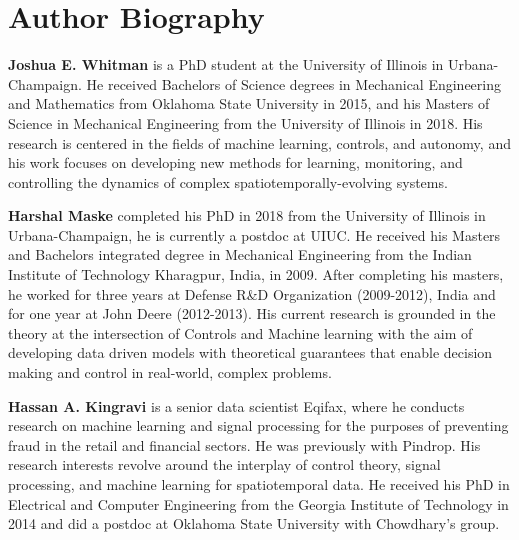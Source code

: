 \documentclass[letterpaper,12pt,peerreviewca,draftcls]{IEEEtran}
\begin{document}
\renewcommand{\thealgorithm}{S\arabic{algorithm}} 
\setcounter{algorithm}{0}

\clearpage


\clearpage


\clearpage





\newpage
\section{Author Biography}

\noindent \textbf{Joshua E. Whitman} is a PhD student at the University of Illinois in Urbana-Champaign. He received Bachelors of Science degrees in Mechanical Engineering and Mathematics from Oklahoma State University in 2015, and his Masters of Science in Mechanical Engineering from the University of Illinois in 2018. His research is centered in the fields of machine learning, controls, and autonomy, and his work focuses on developing new methods for learning, monitoring, and controlling the dynamics of complex spatiotemporally-evolving systems.

\noindent \textbf{Harshal Maske} completed his PhD in 2018 from the University of Illinois in Urbana-Champaign, he is currently a postdoc at UIUC. He received his Masters and Bachelors integrated degree in Mechanical Engineering from the Indian Institute of Technology Kharagpur, India, in 2009. After completing his masters, he worked for three years at Defense R\&D Organization (2009-2012), India and for one year at John Deere (2012-2013). His current research is grounded in the theory at the intersection of Controls and Machine learning with the aim of developing data driven models with theoretical guarantees that enable decision making and control in real-world, complex problems.

\noindent \textbf{Hassan A. Kingravi}  is a senior data scientist Eqifax, where he conducts research on machine learning and signal processing for the purposes of preventing fraud in the retail and financial sectors. He was previously with Pindrop. His research interests revolve around the interplay of control theory, signal processing, and machine learning for spatiotemporal data. He received his PhD in Electrical and Computer Engineering from the Georgia Institute of Technology in 2014 and did a postdoc at Oklahoma State University with Chowdhary's group.
\end{document}

